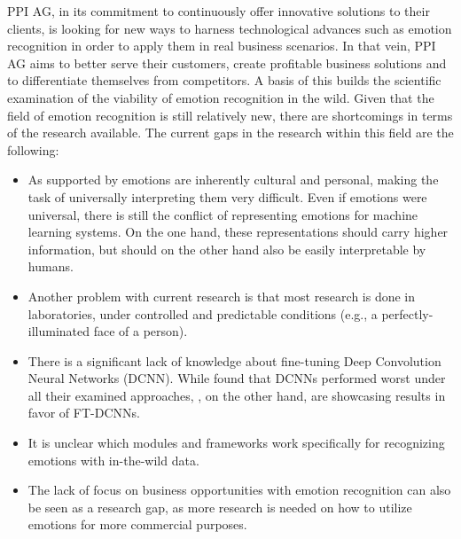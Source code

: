 \newline\newline
PPI AG, in its commitment to continuously offer innovative solutions to their clients, is looking for new ways to harness technological advances such as emotion recognition in order to apply them in real business scenarios. In that vein, PPI AG aims to better serve their customers, create profitable business solutions and to differentiate themselves from competitors. A basis of this builds the scientific examination of the viability of emotion recognition in the wild. Given that the field of emotion recognition is still relatively new, there are shortcomings in terms of the research available.
\newline\newline
The current gaps in the research within this field are the following:\newline
\begin{itemize}
    \item As supported by \citet{Salah:2018:VideoBasedER} emotions are inherently cultural and personal, making the task of universally interpreting them very difficult. Even if emotions were universal, there is still the conflict of representing emotions for machine learning systems. On the one hand, these representations should carry higher information, but should on the other hand also be easily interpretable by humans.
    \item Another problem with current research is that most research is done in laboratories, under controlled and predictable conditions (e.g., a perfectly-illuminated face of a person).
    \item There is a significant lack of knowledge about fine-tuning Deep Convolution Neural Networks (DCNN). While \citet{Kossaifi:2017:AFEW-VADatabase} found that DCNNs performed worst under all their examined approaches, \citet{Handrich:2020:SimultaneousPredVA}, on the other hand, are showcasing results in favor of FT-DCNNs.
    \item It is unclear which modules and frameworks work specifically for recognizing emotions with in-the-wild data.
    \item The lack of focus on business opportunities with emotion recognition can also be seen as a research gap, as more research is needed on how to utilize emotions for more commercial purposes.
\end{itemize}

